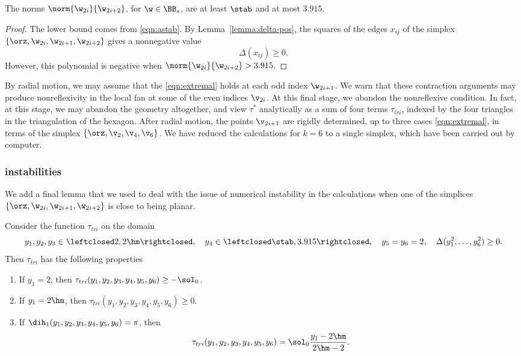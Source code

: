 \figARTLHOI %

\begin{lemma}
The norms $\norm{\w_{2i}}{\w_{2i+2}}$, for $\w\in \BB_s$, 
are at least $\stab$ and at most $3.915$.
\end{lemma}

\begin{proof}
  The lower bound comes from \eqref{eqn:astab}.  By
  Lemma~\ref{lemma:delta-pos}, the squares of the edges $x_{ij}$ of
  the simplex $\{\orz,\w_{2i},\w_{2i+1},\w_{2i+2}\}$ gives a
  nonnegative value
\[
\Delta(x_{ij})\ge 0.
\]
However, this polynomial is  negative when
$\norm{\w_{2i}}{\w_{2i+2}} > 3.915$.
\end{proof}

By radial motion, we may assume that the \eqref{eqn:extremal} holds at
each odd index $\w_{2i+1}$.  We warn that these contraction arguments
may produce nonreflexivity in the local fan at some of the even
indices $\v_{2i}$.  At this final stage, we abandon the nonreflexive
condition.  In fact, at this stage, we may abandon the geometry
altogether, and view $\tau^*$ analytically as a sum of four terms
$\tau_{tri}$, indexed by the four triangles in the triangulation of
the hexagon.  After radial motion, the points $\v_{2i+1}$ are rigidly
determined, up to three cases \eqref{eqn:extremal}, in terms of the
simplex $\{\orz,\v_2,\v_4,\v_6\}$.  We have reduced the calculations
for $k=6$ to a single simplex, which have been carried out by
computer.

\subsubsection{instabilities}

We add a final lemma that we used to deal with the issue of numerical
instability in the calculations when one of the simplices 
$\{\orz,\w_{2i},\w_{2i+1},\w_{2i+2}\}$ is close to being planar.

%
\begin{lemma}
Consider the function $\tau_{tri}$
on the domain
\[
y_1,y_2,y_3\in\leftclosed 2,2\hm\rightclosed,
\quad y_4\in\leftclosed \stab,3.915\rightclosed,
\quad y_5=y_6=2,\quad
\Delta(y_1^2,\ldots,y_6^2)\ge0.
\]
Then $\tau_{tri}$ has the following properties
\begin{enumerate}
\item If $y_1=2$, then $\tau_{tri}(y_1,y_2,y_3,y_4,y_5,y_6)\ge -\sol_0$.
\item If $y_1=2\hm$, then $\tau_{tri}(y_1,y_2,y_3,y_4,y_5,y_6)\ge 0$.
\item If $\dih_1(y_1,y_2,y_3,y_4,y_5,y_6) =\pi$, then 
  \[
  \tau_{tri}(y_1,y_2,y_3,y_4,y_5,y_6) = \sol_0\dfrac{y_1 -2\hm}{2\hm-2}.
  \]
\end{enumerate}
\end{lemma}

